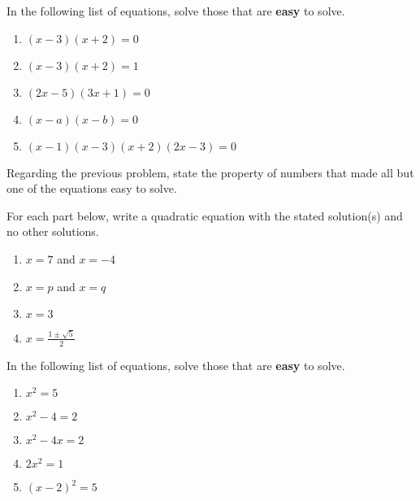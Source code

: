 \vfill

\newpage

\begin{prob}
In the following list of equations, solve those that are \textbf{easy} to solve.  
\begin{enumerate}
\item $(x-3)(x+2)=0$
\item $(x-3)(x+2)=1$
\item $(2x-5)(3x+1)=0$
\item $(x-a)(x-b)=0$
\item $(x-1)(x-3)(x+2)(2x-3)=0$
\end{enumerate}
\end{prob}

\begin{prob}
Regarding the previous problem, state the property of numbers that made all but one of the equations easy to solve.  
\end{prob}
\vspace{0.3in}


\begin{prob}For each part below, write a quadratic equation with the stated solution(s) and no other solutions.  
\begin{enumerate}
\item $x=7$ and $x=-4$
\item $x=p$ and $x=q$
\item $x=3$
\item $x=\frac{1\pm\sqrt{5}}{2}$
 \end{enumerate}
\end{prob}

\begin{prob}
In the following list of equations, solve those that are \textbf{easy} to solve.  
\begin{enumerate}
\item $x^2=5$
\item $x^2 - 4 = 2$
\item $x^2 - 4x = 2$
\item $2x^2=1$
\item $(x-2)^2=5$
\end{enumerate}
\end{prob}
\vspace{0.3in}

